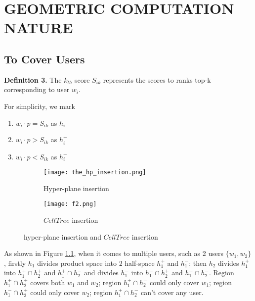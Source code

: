 \chapter{GEOMETRIC COMPUTATION NATURE}
\label{chap:chap-three}

\section{To Cover Users}
{\bfseries Definition 3.} The $k_{th}$ score $S_{ik}$ represents the scores 
to ranks top-k corresponding to user $w_i$. 

For simplicity, we mark 
\begin{enumerate}
    \item $w_i\cdot p=S_{ik}$ as $h_i$
    \item $w_i\cdot p>S_{ik}$ as $h_i^+$
    \item $w_i\cdot p<S_{ik}$ as $h_i^-$
\end{enumerate}

\begin{figure}[hbt!]
  \centering
  \begin{subfigure}[b]{0.45\linewidth}
    \texttt{[image: the\_hp\_insertion.png]}
    \caption{Hyper-plane insertion}
    \label{the_hp_insertion}
  \end{subfigure}
  \begin{subfigure}[b]{0.45\linewidth}
    \texttt{[image: f2.png]}
    \caption{$CellTree$ insertion}
    \label{cell_tree_nodes}
  \end{subfigure}
  \caption{hyper-plane insertion and $CellTree$ insertion}
\end{figure}

As shown in Figure \ref{the_hp_insertion}, when it comes to multiple users, 
such as 2 users
 $\{w_1, w_2\}$, firstly $h_1$ divides product space into 2 half-space 
 $h_1^+$ and $h_1^-$; then $h_2$ divides $h_1^+$ into $h_1^+\cap h_2^+$ 
 and $h_1^+\cap h_2^-$ and divides $h_1^-$ into $h_1^-\cap h_2^+$ and 
 $h_1^-\cap h_2^-$. 
Region $h_1^+\cap h_2^+$ covers both $w_1$ and $w_2$; region $h_1^+\cap h_2^-$  
could only cover $w_1$; region $h_1^-\cap h_2^+$ could only cover $w_2$; 
region $h_1^+\cap h_2^-$ can't cover any user.

